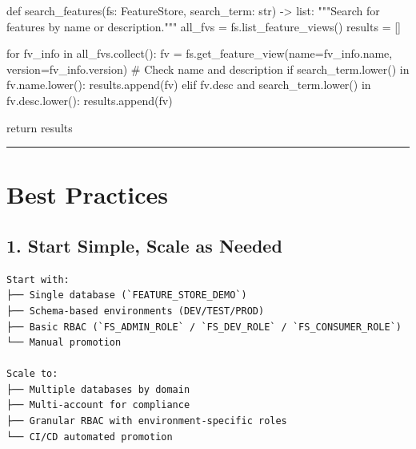 \documentclass[
  letterpaper,
  DIV=11,
  numbers=noendperiod]{scrreprt}
\newenvironment{Shaded}{\begin{snugshade}}{\end{snugshade}}
\newcommand{\BuiltInTok}[1]{\textcolor[rgb]{0.00,0.23,0.31}{#1}}
\newcommand{\CommentTok}[1]{\textcolor[rgb]{0.37,0.37,0.37}{#1}}
\newcommand{\ControlFlowTok}[1]{\textcolor[rgb]{0.00,0.23,0.31}{#1}}
\newcommand{\KeywordTok}[1]{\textcolor[rgb]{0.00,0.23,0.31}{#1}}
\newcommand{\NormalTok}[1]{\textcolor[rgb]{0.00,0.23,0.31}{#1}}
\newcommand{\OperatorTok}[1]{\textcolor[rgb]{0.37,0.37,0.37}{#1}}
\begin{document}
\begin{Shaded}
\begin{Highlighting}[]
\KeywordTok{def}\NormalTok{ search\_features(fs: FeatureStore, search\_term: }\BuiltInTok{str}\NormalTok{) }\OperatorTok{{-}\textgreater{}} \BuiltInTok{list}\NormalTok{:}
    \CommentTok{"""Search for features by name or description."""}
\NormalTok{    all\_fvs }\OperatorTok{=}\NormalTok{ fs.list\_feature\_views()}
\NormalTok{    results }\OperatorTok{=}\NormalTok{ []}
    
    \ControlFlowTok{for}\NormalTok{ fv\_info }\KeywordTok{in}\NormalTok{ all\_fvs.collect():}
\NormalTok{        fv }\OperatorTok{=}\NormalTok{ fs.get\_feature\_view(name}\OperatorTok{=}\NormalTok{fv\_info.name, version}\OperatorTok{=}\NormalTok{fv\_info.version)}
        \CommentTok{\# Check name and description}
        \ControlFlowTok{if}\NormalTok{ search\_term.lower() }\KeywordTok{in}\NormalTok{ fv.name.lower():}
\NormalTok{            results.append(fv)}
        \ControlFlowTok{elif}\NormalTok{ fv.desc }\KeywordTok{and}\NormalTok{ search\_term.lower() }\KeywordTok{in}\NormalTok{ fv.desc.lower():}
\NormalTok{            results.append(fv)}
    
    \ControlFlowTok{return}\NormalTok{ results}
\end{Highlighting}
\end{Shaded}

\begin{center}\rule{0.5\linewidth}{0.5pt}\end{center}

\hypertarget{best-practices}{%
\section{Best Practices}\label{best-practices}}

\hypertarget{start-simple-scale-as-needed}{%
\subsection{1. Start Simple, Scale as
Needed}\label{start-simple-scale-as-needed}}

\begin{verbatim}
Start with:
├── Single database (`FEATURE_STORE_DEMO`)
├── Schema-based environments (DEV/TEST/PROD)
├── Basic RBAC (`FS_ADMIN_ROLE` / `FS_DEV_ROLE` / `FS_CONSUMER_ROLE`)
└── Manual promotion

Scale to:
├── Multiple databases by domain
├── Multi-account for compliance
├── Granular RBAC with environment-specific roles
└── CI/CD automated promotion
\end{verbatim}
\end{document}
